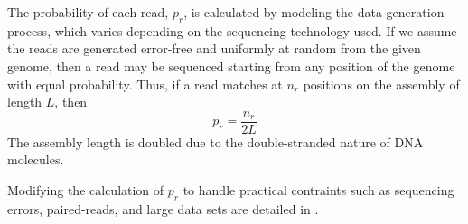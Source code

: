 The probability of each read, $p_r$, is calculated by modeling the data generation process, which varies depending on the sequencing technology used.
If we assume the reads are generated error-free and uniformly at random from the given genome, then a read may be sequenced starting from any position of the genome with equal probability.
Thus, if a read
matches at $n_r$ positions on the assembly of length $L$, then
\begin{equation}
  \label{error_free_probability}
  p_r = \frac{n_r}{2L}
\end{equation}
The assembly length is doubled due to the double-stranded nature of DNA molecules.

Modifying the calculation of $p_r$ to handle practical contraints such as sequencing errors, paired-reads, and large data sets are detailed in \cite{LAP}.




